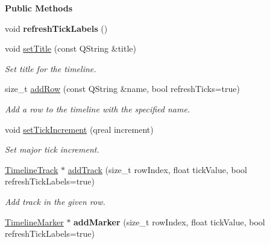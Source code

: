 \begin{Indent}\textbf{ Public Methods}\par
\begin{DoxyCompactItemize}
\item 
\mbox{\label{classrev_1_1_view_1_1_timeline_addcddc95713226590980159120377694}} 
void {\bfseries refresh\+Tick\+Labels} ()
\item 
\mbox{\label{classrev_1_1_view_1_1_timeline_a91d21eaf875b2a7b1602ff32e6cc0289}} 
void \mbox{\hyperlink{classrev_1_1_view_1_1_timeline_a91d21eaf875b2a7b1602ff32e6cc0289}{set\+Title}} (const Q\+String \&title)
\begin{DoxyCompactList}\small\item\em Set title for the timeline. \end{DoxyCompactList}\item 
\mbox{\label{classrev_1_1_view_1_1_timeline_a05f6dc434265f21a00e27e4c89675ea0}} 
size\+\_\+t \mbox{\hyperlink{classrev_1_1_view_1_1_timeline_a05f6dc434265f21a00e27e4c89675ea0}{add\+Row}} (const Q\+String \&name, bool refresh\+Ticks=true)
\begin{DoxyCompactList}\small\item\em Add a row to the timeline with the specified name. \end{DoxyCompactList}\item 
\mbox{\label{classrev_1_1_view_1_1_timeline_a6458169b3371c8f94bc23336893fdd4b}} 
void \mbox{\hyperlink{classrev_1_1_view_1_1_timeline_a6458169b3371c8f94bc23336893fdd4b}{set\+Tick\+Increment}} (qreal increment)
\begin{DoxyCompactList}\small\item\em Set major tick increment. \end{DoxyCompactList}\item 
\mbox{\label{classrev_1_1_view_1_1_timeline_af83323db315447a2a67a203877deeed6}} 
\mbox{\hyperlink{classrev_1_1_view_1_1_timeline_track}{Timeline\+Track}} $\ast$ \mbox{\hyperlink{classrev_1_1_view_1_1_timeline_af83323db315447a2a67a203877deeed6}{add\+Track}} (size\+\_\+t row\+Index, float tick\+Value, bool refresh\+Tick\+Labels=true)
\begin{DoxyCompactList}\small\item\em Add track in the given row. \end{DoxyCompactList}\item 
\mbox{\label{classrev_1_1_view_1_1_timeline_aaeddfd2d669955d37bb64d04111c8f87}} 
\mbox{\hyperlink{classrev_1_1_view_1_1_timeline_marker}{Timeline\+Marker}} $\ast$ {\bfseries add\+Marker} (size\+\_\+t row\+Index, float tick\+Value, bool refresh\+Tick\+Labels=true)
\end{DoxyCompactItemize}
\end{Indent}


